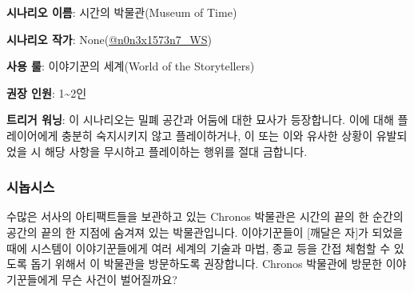 \documentclass{report}
\begin{document}
	\textbf{시나리오 이름}: 시간의 박물관(Museum of Time)
	
	\textbf{시나리오 작가}: None(\href{https://www.twitter.com/n0n3x1573n7_WS}{@n0n3x1573n7\_WS})
	
	\textbf{사용 룰}: 이야기꾼의 세계(World of the Storytellers)
	
	\textbf{권장 인원}: 1\textasciitilde2인
	
	\textbf{트리거 워닝}: 이 시나리오는 밀폐 공간과 어둠에 대한 묘사가 등장합니다. 이에 대해 플레이어에게 충분히 숙지시키지 않고 플레이하거나, 이 또는 이와 유사한 상황이 유발되었을 시 해당 사항을 무시하고 플레이하는 행위를 절대 금합니다.
	
	\subsubsection*{시놉시스}
	
	수많은 서사의 아티팩트들을 보관하고 있는 Chronos 박물관은 시간의 끝의 한 순간의 공간의 끝의 한 지점에 숨겨져 있는 박물관입니다. 이야기꾼들이 [깨달은 자]가 되었을 때에 시스템이 이야기꾼들에게 여러 세계의 기술과 마법, 종교 등을 간접 체험할 수 있도록 돕기 위해서 이 박물관을 방문하도록 권장합니다. Chronos 박물관에 방문한 이야기꾼들에게 무슨 사건이 벌어질까요?
\end{document}
